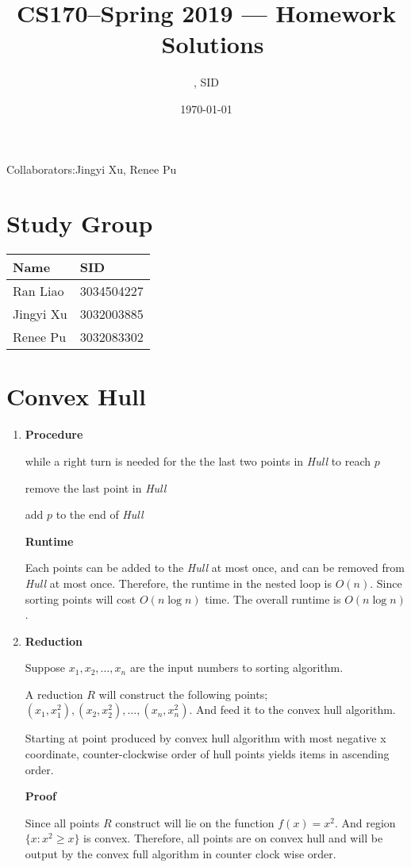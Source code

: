 \documentclass[11pt]{article}
\title{CS170--Spring 2019 --- Homework \Homework\ Solutions}
\author{\Name, SID \SID}
\date{\today}
\newenvironment{qparts}{\begin{enumerate}[{(}a{)}]}{\end{enumerate}}
\begin{document}
\maketitle
Collaborators:Jingyi Xu, Renee Pu

\section{Study Group}
	\begin{tabular}{ll}
		Name		&   SID         		\\\hline
		Ran Liao		&   3034504227  	\\  
		Jingyi Xu		&   3032003885  	\\
		Renee Pu		&   3032083302  	\\
	\end{tabular}

	
\newpage
\section{Convex Hull}

\begin{qparts}
	\item
	\textbf{Procedure}
	
	while a right turn is needed for the the last two points in \textit{Hull} to reach $p$
	
	\qquad remove the last point in \textit{Hull}
	
	add $p$ to the end of \textit{Hull}
	
	\textbf{Runtime}
	
	Each points can be added to  the \textit{Hull} at most once, and can be removed from \textit{Hull} at most once.
	Therefore, the runtime in the nested loop is $O(n)$. 
	Since sorting points will cost $O(n\log n)$ time. The overall runtime is $O(n\log n)$.
	
	\item
	
	\textbf{Reduction}
	
	Suppose $x_1, x_2, \dots, x_n$ are the input numbers to sorting algorithm.
	
	A reduction $R$ will construct the following points; $(x_1, x_1^2), (x_2, x_2^2), \dots, (x_n, x_n^2)$. And feed it to the convex hull algorithm.
	
	 Starting at point produced by convex hull algorithm with most negative x coordinate, counter-clockwise order of hull points yields items in ascending order.
	 
	 \textbf{Proof}
	 
	 Since all points $R$ construct will lie on the function $f(x) = x^2$. And region $\{x: x^2 \ge x\}$ is convex. Therefore, all points are on convex hull and will be output by the convex full algorithm in counter clock wise order.
	
\end{qparts}
\end{document}
